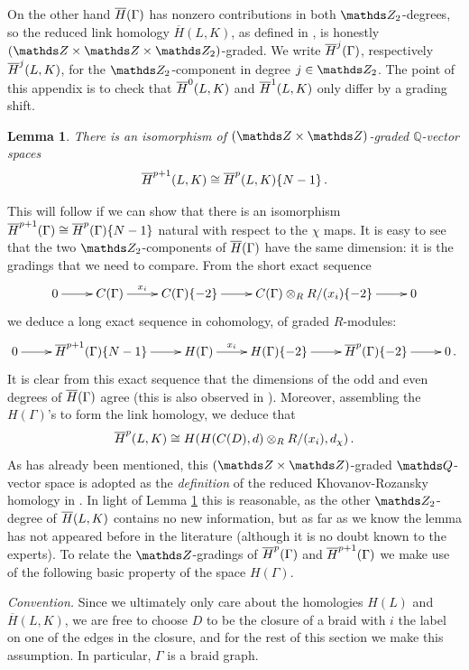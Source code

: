 \documentclass{compositio}
\newtheorem{lemma}[theorem]{Lemma}
\theoremstyle{definition}
\numberwithin{equation}{section}
\begin{document}
On the other hand $\overline{H}(\Gamma)$ has nonzero contributions in both $\Ztwo$-degrees, so the reduced link homology $\overline{H}(L,K)$, as defined in \cite{kr0401268}, is honestly $(\ZZ \times \ZZ \times \Ztwo)$-graded. We write $\overline{H}^j(\Gamma)$, respectively $\overline{H}^j(L,K)$, for the $\Ztwo$-component in degree $j \in \Ztwo$. The point of this appendix is to check that $\overline{H}^0(L,K)$ and $\overline{H}^1(L,K)$ only differ by a grading shift.

\begin{lemma}\label{lemma:redvsunred} There is an isomorphism of $(\ZZ \times \ZZ)$-graded $\mathds{Q}$-vector spaces 
\[
\overline{H}^{p+1}(L,K) \cong \overline{H}^{p}(L,K)\{N-1\} \, .
\]
\end{lemma}

This will follow if we can show that there is an isomorphism $\overline{H}^{p+1}(\Gamma) \cong \overline{H}^p(\Gamma)\{N-1\}$ natural with respect to the $\chi$ maps. It is easy to see that the two $\Ztwo$-components of $\overline{H}(\Gamma)$ have the same dimension: it is the gradings that we need to compare. From the short exact sequence
\[
\xymatrix{%
0 \ar[r] & C(\Gamma) \ar[r]^-{x_{i}} & C(\Gamma)\{-2\} \ar[r] & C(\Gamma) \otimes_R R/(x_{i})\{-2\} \ar[r] & 0
}
\]
we deduce a long exact sequence in cohomology, of graded $R$-modules:
\begin{equation}\label{eq:redvsunred_seq}
\xymatrix{%
0 \ar[r] & \redh^{p+1}(\Gamma)\{N-1\} \ar[r] & H(\Gamma) \ar[r]^-{x_{i}} & H(\Gamma)\{-2\} \ar[r] & \redh^p(\Gamma)\{-2\} \ar[r] & 0 \, .
}
\end{equation}
It is clear from this exact sequence that the dimensions of the odd and even degrees of $\overline{H}(\Gamma)$ agree (this is also observed in \cite[Proposition 3.12]{r0607544}). Moreover, assembling the $H(\Gamma)$'s to form the link homology, we deduce that
\[
\overline{H}^p(L, K) \cong H(H(C(D),d) \otimes_R R/(x_i), d_{\chi})\,.
\]
As has already been mentioned, this $(\ZZ \times \ZZ)$-graded $\QQ$-vector space is adopted as the \emph{definition} of the reduced Khovanov-Rozansky homology in \cite{r0607544,websterblah, rasmussenblah}. In light of Lemma \ref{lemma:redvsunred} this is reasonable, as the other $\Ztwo$-degree of $\overline{H}(L,K)$ contains no new information, but as far as we know the lemma has not appeared before in the literature (although it is no doubt known to the experts). To relate the $\ZZ$-gradings of $\overline{H}^p(\Gamma)$ and $\overline{H}^{p+1}(\Gamma)$ we make use of the following basic property of the space $H(\Gamma)$.

\textit{Convention.} Since we ultimately only care about the homologies $H(L)$ and $\overline{H}(L,K)$, we are free to choose $D$ to be the closure of a braid with $i$ the label on one of the edges in the closure, and for the rest of this section we make this assumption. In particular, $\Gamma$ is a braid graph.
\end{document}
